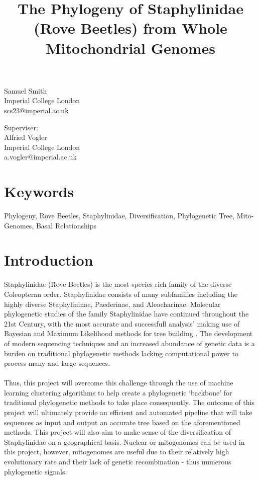 \documentclass[12pt]{article}
\title{The Phylogeny of Staphylinidae (Rove Beetles) from Whole Mitochondrial Genomes}
\begin{document}
\singlespacing
\begin{titlepage}
    \maketitle
    \begin{center}
        Samuel Smith \\ Imperial College London \\ scs23@imperial.ac.uk
    \end{center}
    \begin{center}
        Superviser: \\ Alfried Vogler \\ Imperial College London \\ a.vogler@imperial.ac.uk
    \end{center}
\end{titlepage}


    \section{Keywords}
    Phylogeny, Rove Beetles, Staphylinidae, Diversification, Phylogenetic Tree, Mito-Genomes, Basal Relationships
    \section{Introduction}
    Staphylinidae (Rove Beetles) is the most species rich family of the diverse Coleopteran order. Staphylinidae consists of many subfamilies including the highly diverse Staphylininae, Paederinae, and Aleocharinae. Molecular phylogenetic studies of the family Staphylinidae have continued throughout the 21st Century, with the most accurate and successfull analysis' making use of Bayesian and Maximum Likelihood methods for tree building \cite{Gusarov2018}. The development of modern sequencing techniques and an increased abundance of genetic data is a burden on traditional phylogenetic methods lacking computational power to process many and large sequences.\\ \\
    Thus, this project will overcome this challenge through the use of machine learning clustering algorithms to help create a phylogenetic `backbone' for traditional phylogenetic methods to take place consequently. The outcome of this project will ultimately provide an efficient and automated pipeline that will take sequences as input and output an accurate tree based on the aforementioned methods. This project will also aim to make sense of the diversification of Staphylinidae on a geographical basis. Nuclear or mitogenomes can be used in this project, however, mitogenomes are useful due to their relatively high evolutionary rate and their lack of genetic recombination - thus numerous phylogenetic signals. 
\end{document}
